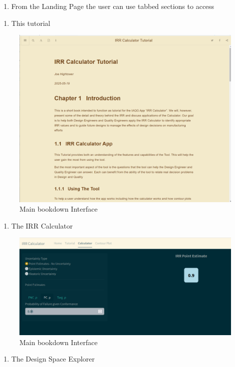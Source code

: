 \documentclass[
]{article}
\providecommand{\tightlist}{%
  \setlength{\itemsep}{0pt}\setlength{\parskip}{0pt}}
\begin{document}
\begin{enumerate}
\def\labelenumi{\arabic{enumi}.}
\setcounter{enumi}{1}
\tightlist
\item
  From the Landing Page the user can use tabbed sections to access
\end{enumerate}

\begin{enumerate}
\def\labelenumi{\alph{enumi}.}
\tightlist
\item
  This tutorial
\end{enumerate}

\begin{figure}

{\centering \includegraphics[width=0.5\linewidth]{Main Book Interface} 

}

\caption{Main bookdown Interface}\label{fig:unnamed-chunk-9}
\end{figure}

\begin{enumerate}
\def\labelenumi{\alph{enumi}.}
\setcounter{enumi}{1}
\tightlist
\item
  The IRR Calculator
\end{enumerate}

\begin{figure}

{\centering \includegraphics[width=0.5\linewidth]{IRR_Calculator} 

}

\caption{Main bookdown Interface}\label{fig:unnamed-chunk-10}
\end{figure}

\begin{enumerate}
\def\labelenumi{\alph{enumi}.}
\setcounter{enumi}{2}
\tightlist
\item
  The Design Space Explorer
\end{enumerate}
\end{document}
